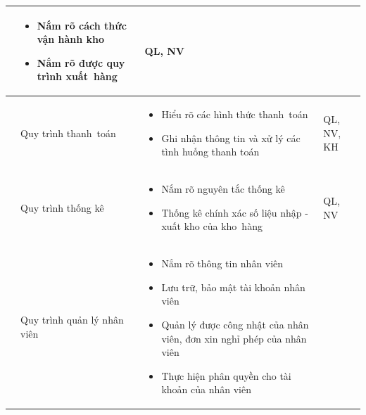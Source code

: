 \documentclass[a4paper,12pt]{report}
\begin{document}
\begin{center}
\begin{longtable}{|>{\centering\arraybackslash}c|
        >{\centering\arraybackslash}p{4cm}|
        >{\centering\arraybackslash}p{6.5cm}|
        >{\centering\arraybackslash}p{4cm}|}
                                                                                          &
        \begin{itemize}
            \item Nắm rõ cách thức vận hành kho
            \item Nắm rõ được quy trình xuất~hàng
        \end{itemize}
                                                                                          & QL, NV                                 \\
        \hline
        4                                                                                 & Quy trình thanh~toán
                                                                                          &
        \begin{itemize}
            \item Hiểu rõ các hình thức thanh~toán
            \item Ghi nhận thông tin và xử lý các tình huống thanh toán
        \end{itemize}
                                                                                          & QL, NV, KH                             \\
        \hline
        5                                                                                 & Quy trình thống kê
                                                                                          &
        \begin{itemize}
            \item Nắm rõ nguyên tắc thống kê
            \item Thống kê chính xác số liệu nhập - xuất kho của kho~hàng
        \end{itemize}                     & QL, NV                                                               \\
        \hline
        6                                                                                 & Quy trình quản lý nhân viên
                                                                                          &
        \begin{itemize}
            \item Nắm rõ thông tin nhân viên
            \item Lưu trữ, bảo mật tài khoản nhân viên
            \item Quản lý được công nhật của nhân viên, đơn xin nghỉ phép của nhân viên
            \item Thực hiện phân quyền cho tài khoản của nhân viên

\end{itemize}
\end{longtable}
\end{center}
\end{document}
